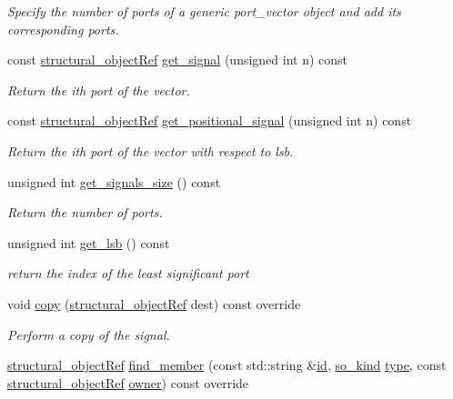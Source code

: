 \begin{DoxyCompactItemize}
\begin{DoxyCompactList}\small\item\em Specify the number of ports of a generic port\+\_\+vector object and add its corresponding ports. \end{DoxyCompactList}\item 
const \hyperlink{structural__objects_8hpp_a8ea5f8cc50ab8f4c31e2751074ff60b2}{structural\+\_\+object\+Ref} \hyperlink{classsignal__o_a66328704e54e93748a068487c72e2ba9}{get\+\_\+signal} (unsigned int n) const
\begin{DoxyCompactList}\small\item\em Return the ith port of the vector. \end{DoxyCompactList}\item 
const \hyperlink{structural__objects_8hpp_a8ea5f8cc50ab8f4c31e2751074ff60b2}{structural\+\_\+object\+Ref} \hyperlink{classsignal__o_a87c5bca9f6a401ad0c7931689ebf87de}{get\+\_\+positional\+\_\+signal} (unsigned int n) const
\begin{DoxyCompactList}\small\item\em Return the ith port of the vector with respect to lsb. \end{DoxyCompactList}\item 
unsigned int \hyperlink{classsignal__o_a56252b61b675df237d5b7bca998a345a}{get\+\_\+signals\+\_\+size} () const
\begin{DoxyCompactList}\small\item\em Return the number of ports. \end{DoxyCompactList}\item 
unsigned int \hyperlink{classsignal__o_a7f74d2fd1067b338fbf0d8c404af1114}{get\+\_\+lsb} () const
\begin{DoxyCompactList}\small\item\em return the index of the least significant port \end{DoxyCompactList}\item 
void \hyperlink{classsignal__o_a9d35d1b08d9dd1f0945f9481e88d5a5b}{copy} (\hyperlink{structural__objects_8hpp_a8ea5f8cc50ab8f4c31e2751074ff60b2}{structural\+\_\+object\+Ref} dest) const override
\begin{DoxyCompactList}\small\item\em Perform a copy of the signal. \end{DoxyCompactList}\item 
\hyperlink{structural__objects_8hpp_a8ea5f8cc50ab8f4c31e2751074ff60b2}{structural\+\_\+object\+Ref} \hyperlink{classsignal__o_aaab4b1d17a1ea687a8df19eef2a3eaf1}{find\+\_\+member} (const std\+::string \&\hyperlink{classstructural__object_a841a75f6e349ff7c1987dc92d4ac33a6}{id}, \hyperlink{structural__objects_8hpp_acf52399aecacb7952e414c5746ce6439}{so\+\_\+kind} \hyperlink{classstructural__object_a9a7159ce4c8da9984f256d9032f49778}{type}, const \hyperlink{structural__objects_8hpp_a8ea5f8cc50ab8f4c31e2751074ff60b2}{structural\+\_\+object\+Ref} \hyperlink{classstructural__object_a3e96b3e00b8a78adfc44872d82e186ea}{owner}) const override

\end{DoxyCompactItemize}
